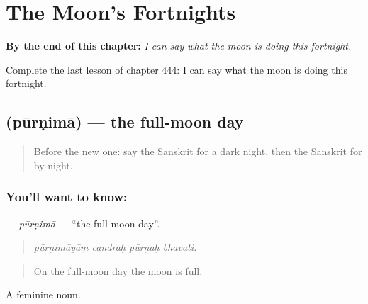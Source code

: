 
\chapter{The Moon's Fortnights}
\label{ch:sa-the-moon-s-fortnights}

\begin{chapteropening}
\textbf{By the end of this chapter:} \emph{I can say what the moon is doing this fortnight.}

Complete the last lesson of chapter 444: I can say what the moon is doing this fortnight.
\end{chapteropening}

\section[\texorpdfstring{\sk{पूर्णिमा} (pūrṇimā)}{पूर्णिमा (pūrṇimā)}]{ (pūrṇimā) — the full-moon day}

\label{lesson:SA-C444-purnima}



\begin{quote}
Before the new one: say the Sanskrit for a dark night, then the Sanskrit for by night.
\end{quote}

\subsection*{You'll want to know: }
\textbf{} — \emph{pūrṇimā} — \textquotedblleft{}the full-moon day\textquotedblright{}.

\begin{quote}
   
\end{quote}

\begin{quote}
\emph{pūrṇimāyāṃ candraḥ pūrṇaḥ bhavati.}
\end{quote}

\begin{quote}
On the full-moon day the moon is full.
\end{quote}

A feminine noun.

